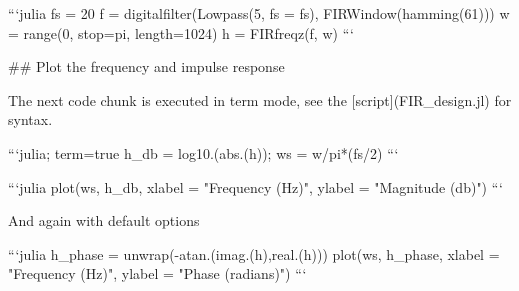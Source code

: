 ```julia
fs = 20
f = digitalfilter(Lowpass(5, fs = fs), FIRWindow(hamming(61)))
w = range(0, stop=pi, length=1024)
h = FIRfreqz(f, w)
```

## Plot the frequency and impulse response


The next code chunk is executed in term mode, see the [script](FIR_design.jl)
for syntax.

```julia; term=true
h_db = log10.(abs.(h));
ws = w/pi*(fs/2)
```

```julia
plot(ws, h_db,
      xlabel = "Frequency (Hz)", ylabel = "Magnitude (db)")
```

And again with default options

```julia
h_phase = unwrap(-atan.(imag.(h),real.(h)))
plot(ws, h_phase,
    xlabel = "Frequency (Hz)", ylabel = "Phase (radians)")
```



\inx
\fin
\con
